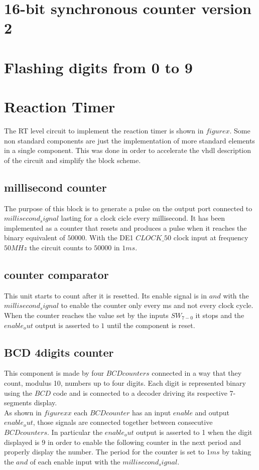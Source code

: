 \documentclass[12pt]{article}
\begin{document}
\section{16-bit synchronous counter version 2}
\section{Flashing digits from 0 to 9}
\section{Reaction Timer}
The RT level circuit to implement the reaction timer is shown in $figure x$. Some non standard components are just the implementation of more standard elements in a single component. This was done in order to accelerate the vhdl description of the circuit and simplify the block scheme.
\subsection{millisecond counter}
The purpose of this block is to generate a pulse on the output port connected to $millisecond_signal$ lasting for a clock cicle every millisecond. It has been implemented as a counter that resets and produces a pulse when it reaches the binary equivalent of $50000$. With the DE1 $CLOCK\_50$ clock input at frequency $50MHz$ the circuit counts to $50000$ in $1ms$.
\subsection{counter comparator}
This unit starts to count after it is resetted. Its enable signal is in $and$ with the $millisecond_signal$ to enable the counter only every ms and not every clock cycle. \\When the counter reaches the value set by the inputs $SW_{7-0}$ it stops and the $enable_out$ output is asserted to $1$ until the component is reset.
\subsection{BCD 4digits counter}
This component is made by four $BCDcounters$ connected in a way that they count, modulus 10, numbers up to four digits. Each digit is represented binary using the $BCD$ code and is connected to a decoder driving its respective 7-segments display. \\
As shown in $figure xx$ each $BCDcounter$ has an input $enable$ and output $enable_out$, those signals are connected together between consecutive $BCDcounters$. In particular the $enable_out$ output is asserted to 1 when the digit displayed is $9$ in order to enable the following counter in the next period and properly display the number. The period for the counter is set to $1ms$ by taking the $and$ of each enable input with the $millisecond_signal$.
\end{document}
